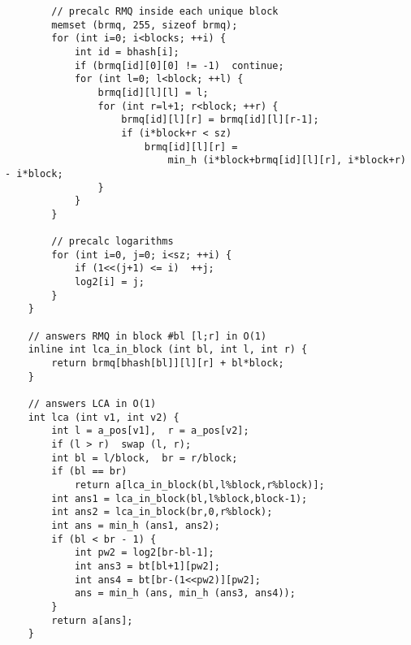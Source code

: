 \documentclass{article}
\begin{document}
\begin{verbatim}
        // precalc RMQ inside each unique block
        memset (brmq, 255, sizeof brmq);
        for (int i=0; i<blocks; ++i) {
            int id = bhash[i];
            if (brmq[id][0][0] != -1)  continue;
            for (int l=0; l<block; ++l) {
                brmq[id][l][l] = l;
                for (int r=l+1; r<block; ++r) {
                    brmq[id][l][r] = brmq[id][l][r-1];
                    if (i*block+r < sz)
                        brmq[id][l][r] =
                            min_h (i*block+brmq[id][l][r], i*block+r) - i*block;
                }
            }
        }

        // precalc logarithms
        for (int i=0, j=0; i<sz; ++i) {
            if (1<<(j+1) <= i)  ++j;
            log2[i] = j;
        }
    }

    // answers RMQ in block #bl [l;r] in O(1)
    inline int lca_in_block (int bl, int l, int r) {
        return brmq[bhash[bl]][l][r] + bl*block;
    }

    // answers LCA in O(1)
    int lca (int v1, int v2) {
        int l = a_pos[v1],  r = a_pos[v2];
        if (l > r)  swap (l, r);
        int bl = l/block,  br = r/block;
        if (bl == br)
            return a[lca_in_block(bl,l%block,r%block)];
        int ans1 = lca_in_block(bl,l%block,block-1);
        int ans2 = lca_in_block(br,0,r%block);
        int ans = min_h (ans1, ans2);
        if (bl < br - 1) {
            int pw2 = log2[br-bl-1];
            int ans3 = bt[bl+1][pw2];
            int ans4 = bt[br-(1<<pw2)][pw2];
            ans = min_h (ans, min_h (ans3, ans4));
        }
        return a[ans];
    }
\end{verbatim}
\end{document}
